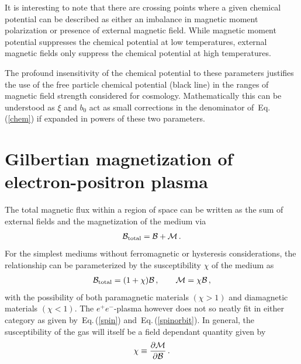 \documentclass[aps,prd,floatfix,reprint]{revtex4-2}
\newcommand{\req}[1]{Eq.\,(\ref{#1})}
\begin{document}
It is interesting to note that there are crossing points where a given chemical potential can be described as either an imbalance in magnetic moment polarization or presence of external magnetic field. While magnetic moment potential suppresses the chemical potential at low temperatures, external magnetic fields only suppress the chemical potential at high temperatures.

The profound insensitivity of the chemical potential to these parameters justifies the use of the free particle chemical potential (black line) in the ranges of magnetic field strength considered for cosmology. Mathematically this can be understood as $\xi$ and $b_{0}$ act as small corrections in the denominator of~\req{chem} if expanded in powers of these two parameters.

\section{Gilbertian magnetization of electron-positron plasma}
\label{sec:magnetization}
\noindent The total magnetic flux within a region of space can be written as the sum of external fields and the magnetization of the medium via
\begin{align}
 \label{totalmag}
 {\cal B}_{\rm total} = {\cal B} + {\cal M}\,.
\end{align}
For the simplest mediums without ferromagnetic or hysteresis considerations, the relationship can be parameterized by the susceptibility $\chi$ of the medium as
\begin{align}
 \label{susceptibility}
 {\cal B}_{\rm total} = (1+\chi){\cal B}\,,\qquad {\cal M} = \chi{\cal B}\,,
\end{align}
with the possibility of both paramagnetic materials $(\chi>1)$ and diamagnetic materials $(\chi<1)$. The $e^{+}e^{-}$-plasma however does not so neatly fit in either category as given by~\req{spin} and~\req{spinorbit}. In general, the susceptibility of the gas will itself be a field dependant quantity given by
\begin{align}
 \chi \equiv \frac{\partial{\cal M}}{\partial{\cal B}}\,.
\end{align}
\end{document}
